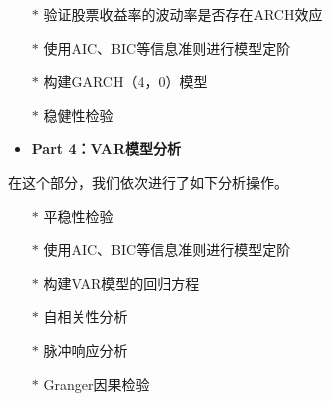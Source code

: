 \documentclass[12pt]{article}
\begin{document}
\begin{itemize}
    \item[$\ast$] 验证股票收益率的波动率是否存在ARCH效应
\end{itemize}

\begin{itemize}
    \item[$\ast$] 使用AIC、BIC等信息准则进行模型定阶
\end{itemize}

\begin{itemize}
    \item[$\ast$] 构建GARCH（4，0）模型
\end{itemize}

\begin{itemize}
    \item[$\ast$] 稳健性检验
\end{itemize}

\begin{itemize}
    \item \textbf{Part 4：VAR模型分析}
\end{itemize}

在这个部分，我们依次进行了如下分析操作。

\begin{itemize}
    \item[$\ast$] 平稳性检验
\end{itemize}

\begin{itemize}
    \item[$\ast$] 使用AIC、BIC等信息准则进行模型定阶
\end{itemize}

\begin{itemize}
    \item[$\ast$] 构建VAR模型的回归方程
\end{itemize}

\begin{itemize}
    \item[$\ast$] 自相关性分析
\end{itemize}

\begin{itemize}
    \item[$\ast$] 脉冲响应分析
\end{itemize}

\begin{itemize}
    \item[$\ast$] Granger因果检验
\end{itemize}
\end{document}
